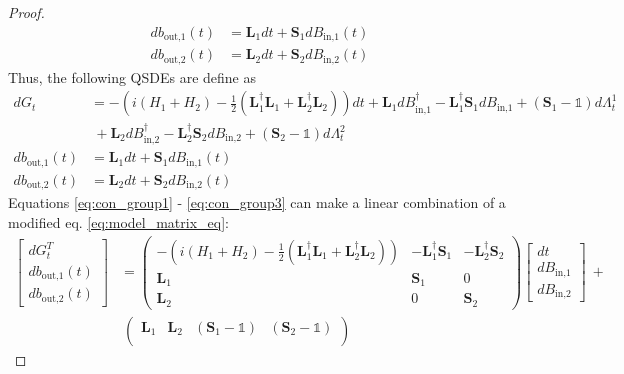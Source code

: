 \documentclass[a4paper]{article}
\theoremstyle{definition}
\begin{document}
\begin{enumerate}[label=(\roman*)]
\begin{proof}
\begin{align*}
    db_{\text{out,1}}(t) & = \textbf{L}_1 dt + \textbf{S}_1 dB_{\text{in,1}}(t)  \\ 
    db_{\text{out,2}}(t) & = \textbf{L}_2 dt + \textbf{S}_2 dB_{\text{in,2}}(t) 
\end{align*}
Thus, the following QSDEs are define as
\begin{align}
    dG_t & = -(i(H_1 + H_2) - \frac{1}{2}(\textbf{L}_1^\dagger \textbf{L}_1 + \textbf{L}_2^\dagger \textbf{L}_2))dt + \textbf{L}_1 dB^\dagger_\text{in,1} - \textbf{L}_1^\dagger \textbf{S}_1 dB_\text{in,1} + (\textbf{S}_1-\mathbb{1}) d\Lambda^1_t  \nonumber \\ 
    &  \ + \textbf{L}_2 dB^\dagger_\text{in,2} - \textbf{L}_2^\dagger \textbf{S}_2 dB_\text{in,2} + (\textbf{S}_2-\mathbb{1}) d\Lambda^2_t \label{eq:con_group1} \\
    db_{\text{out,1}}(t) & = \textbf{L}_1 dt + \textbf{S}_1 dB_{\text{in,1}}(t)  \label{eq:con_group2} \\ 
    db_{\text{out,2}}(t) & = \textbf{L}_2 dt + \textbf{S}_2 dB_{\text{in,2}}(t) \label{eq:con_group3}
\end{align}
Equations \ref{eq:con_group1} - \ref{eq:con_group3} can make a linear combination of a modified eq. \ref{eq:model_matrix_eq}: 
\begin{align}
    \begin{bmatrix}
    dG^T_t \\
    db_{\text{out,1}}(t) \\
    db_{\text{out,2}}(t)
    \end{bmatrix} & = 
    \begin{pmatrix}
     -(i(H_1 + H_2) - \frac{1}{2}(\textbf{L}_1^\dagger \textbf{L}_1 + \textbf{L}_2^\dagger \textbf{L}_2)) & - \textbf{L}_1^\dagger \textbf{S}_1 & - \textbf{L}_2^\dagger \textbf{S}_2 \\
     \textbf{L}_1 & \textbf{S}_1 & 0 \\
     \textbf{L}_2 & 0 & \textbf{S}_2
    \end{pmatrix}
    \begin{bmatrix}
    dt \\
    dB_\text{in,1} \\
    dB_\text{in,2}
    \end{bmatrix} \ + \nonumber \\
    & \
    \begin{pmatrix}
    \textbf{L}_1 & \textbf{L}_2 & (\textbf{S}_1-\mathbb{1}) & (\textbf{S}_2-\mathbb{1}) \\

\end{pmatrix}
\end{align}
\end{proof}
\end{enumerate}
\end{document}
